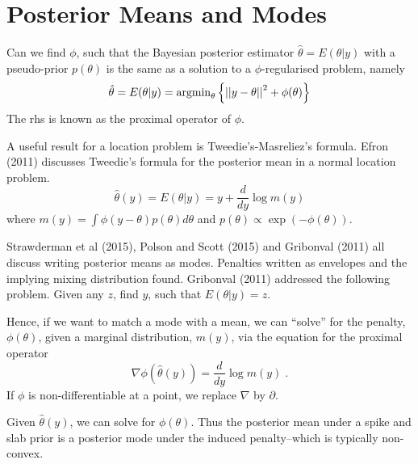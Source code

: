 \documentclass[11pt]{article}%
\newcommand{\vnorm}[1]{\left|\left|#1\right|\right|}
\begin{document}
\section{Posterior Means and Modes}

Can we find $ \phi$, such that the Bayesian posterior estimator $ \hat{\theta} = E( \theta | y) $ with a pseudo-prior $p(\theta) $ is the same
as a solution to a $\phi$-regularised problem, namely
$$
 \hat{\theta} = E( \theta | y) = {\rm arg min}_\theta \left \{ \vnorm{y - \theta }^2 + \phi( \theta ) \right \}
$$
The rhs is known as the proximal operator of $ \phi$.

A useful result for a location problem is Tweedie's-Masreliez's formula. Efron (2011) discusses Tweedie's formula for the posterior mean in a normal location problem.
$$
\hat{\theta}(y) = E( \theta | y ) = y + \frac{d}{dy} \log m(y)
$$
where $ m(y) = \int \phi( y - \theta ) p( \theta ) d \theta $ and $ p(\theta ) \propto \exp \left ( - \phi( \theta ) \right ) $.

Strawderman et al (2015), Polson and Scott (2015) and Gribonval (2011) all discuss writing posterior means as modes.
Penalties written as envelopes and the implying mixing distribution found.
Gribonval (2011) addressed the following problem. Given any $z$, find $ y $, such that $ E(\theta | y ) = z $. 

Hence, if we want to match a mode with a mean, we can ``solve'' for the penalty, $\phi(\theta) $, given a marginal distribution, $m(y)$, via the equation for the proximal operator
$$
\nabla \phi \left ( \hat{\theta} (y) \right ) =  \frac{d}{dy} \log m(y) \; .
$$
If $ \phi $ is non-differentiable at a point, we replace $ \nabla $ by $ \partial $.

Given $ \hat{\theta}(y) $, we can solve for $ \phi( \theta ) $. Thus the posterior mean under a spike and slab prior is a posterior mode under the induced penalty--which is typically non-convex. 
\end{document}
